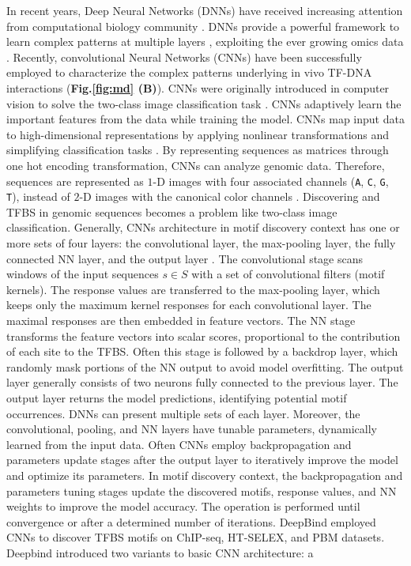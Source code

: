 \documentclass[a4paper, titlepage, openright]{book}
\begin{document}
In recent years, Deep Neural Networks (DNNs) have received increasing attention from computational biology community \citep{talukder2021interpretation,zeng2020integrating,singh2016deepchrome,singh2019predicting,zeng2018prediction,kelley2018sequential,li2019deeptact,yin2019deephistone,manzanarez2018model}. DNNs provide a powerful framework to learn complex patterns at multiple layers \citep{park2015deep}, exploiting the ever growing omics data \citep{zhang2019deep}. Recently, convolutional Neural Networks (CNNs) \citep{lecun2015deep} have been successfully employed to characterize the complex patterns underlying in vivo TF-DNA interactions \citep{alipanahi2015predicting,zhou2015predicting,kelley2016basset,zeng2016convolutional} (\textbf{Fig.\ref{fig:md} (B)}). CNNs were originally introduced in computer vision to solve the two-class image classification task \citep{lecun2015deep,sainath2013improvements,vu2017use}. CNNs adaptively learn the important features from the data while training the model. CNNs map input data to high-dimensional representations by applying nonlinear transformations and simplifying classification tasks \citep{bengio2013representation}. By representing sequences as matrices through one hot encoding transformation, CNNs can analyze genomic data. Therefore, sequences are represented as $1$-D images with four associated channels (\texttt{A}, \texttt{C}, \texttt{G}, \texttt{T}), instead of $2$-D images with the canonical color channels \citep{zeng2016convolutional}. Discovering and TFBS in genomic sequences becomes a problem like two-class image classification. Generally, CNNs architecture in motif discovery context has one or more sets of four layers: the convolutional layer, the max-pooling layer, the fully connected NN layer, and the output layer \citep{zeng2016convolutional}. The convolutional stage scans windows of the input sequences $s \in S$ with a set of convolutional filters (motif kernels). The response values are transferred to the max-pooling layer, which keeps only the maximum kernel responses for each convolutional layer. The maximal responses are then embedded in feature vectors. The NN stage transforms the feature vectors into scalar scores, proportional to the contribution of each site to the TFBS. Often this stage is followed by a backdrop layer, which randomly mask portions of the NN output to avoid model overfitting. The output layer generally consists of two neurons fully connected to the previous layer. The output layer returns the model predictions, identifying potential motif occurrences. DNNs can present multiple sets of each layer. Moreover, the convolutional, pooling, and NN layers have tunable parameters, dynamically learned from the input data. Often CNNs employ backpropagation and parameters update stages after the output layer to iteratively improve the model and optimize its parameters. In motif discovery context, the backpropagation and parameters tuning stages update the discovered motifs, response values, and NN weights to improve the model accuracy. The operation is performed until convergence or after a determined number of iterations. DeepBind \citep{alipanahi2015predicting} employed CNNs to discover TFBS motifs on ChIP-seq, HT-SELEX, and PBM datasets. Deepbind introduced two variants to basic CNN architecture: a 
\end{document}
